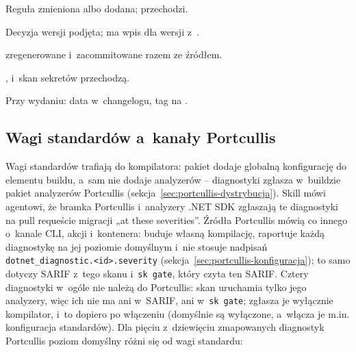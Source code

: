 \begin{checklista}
  \item Reguła zmieniona albo dodana;  przechodzi.
  \item Decyzja wersji podjęta;  ma wpis dla wersji z~.
  \item {} zregenerowane i~zacommitowane razem ze źródłem.
  \item {},  i~skan sekretów przechodzą.
  \item Przy wydaniu: data w~changelogu, tag  na .
\end{checklista}


\subsection{Wagi standardów a~kanały Portcullis}\label{sec:standardy-wagi-kanaly}

Wagi standardów trafiają do kompilatora: pakiet  dodaje
globalną konfigurację do elementu  buildu, a~sam nie dodaje
analyzerów -- diagnostyki  zgłasza w~buildzie pakiet analyzerów
Portcullis (sekcja~\ref{sec:portcullis-dystrybucja}). Skill mówi agentowi, że bramka
Portcullis i~analyzery .NET SDK zgłaszają te diagnostyki na pull requeście migracji „at
these severities”. Źródła Portcullis mówią co innego o~kanale CLI, akcji i~kontenera:
 buduje własną kompilację, raportuje każdą diagnostykę na jej
poziomie domyślnym i~nie stosuje nadpisań \texttt{dotnet\_diagnostic.<id>.severity}
(sekcja~\ref{sec:portcullis-konfiguracja}); to samo dotyczy SARIF z~tego skanu
i~\texttt{sk gate}, który czyta ten SARIF. Cztery diagnostyki  w~ogóle nie
należą do Portcullis: skan uruchamia tylko jego analyzery, więc ich nie ma ani w~SARIF, ani
w~\texttt{sk gate}; zgłasza je wyłącznie kompilator, i~to dopiero po włączeniu (domyślnie
są wyłączone, a~włącza je m.in. konfiguracja standardów). Dla pięciu z~dziewięciu
zmapowanych diagnostyk Portcullis poziom domyślny różni się od wagi standardu:

